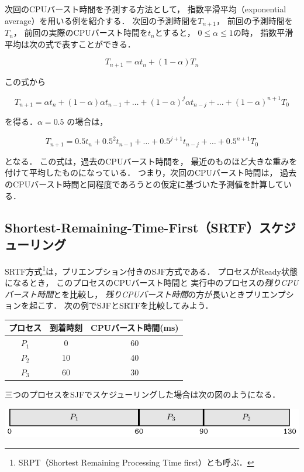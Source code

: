 次回のCPUバースト時間を予測する方法として，
指数平滑平均（exponential average）を用いる例を紹介する．
次回の予測時間を$T_{n+1}$，
前回の予測時間を$T_{n}$，
前回の実際のCPUバースト時間を$t_{n}$とすると，
$0 \le \alpha \le 1$の時，
指数平滑平均は次の式で表すことができる．

\[T_{n+1} = \alpha t_n + ( 1 - \alpha ) T_n\]

この式から

\[T_{n+1} = \alpha t_n + ( 1 - \alpha ) \alpha t_{n-1} + \dots +
( 1 - \alpha )^j \alpha t_{n-j} + \dots + (1 - \alpha )^{n+1} T_0 \]

を得る．$\alpha = 0.5$ の場合は，

\[T_{n+1} = 0.5 t_n + 0.5^2 t_{n-1} + \dots +
0.5^{j+1} t_{n-j} + \dots + 0.5^{n+1} T_0 \]

となる．
この式は，過去のCPUバースト時間を，
最近のものほど大きな重みを付けて平均したものになっている．
つまり，次回のCPUバースト時間は，
過去のCPUバースト時間と同程度であろうとの仮定に基づいた予測値を計算している．

\subsection{Shortest-Remaining-Time-First（SRTF）スケジューリング}
SRTF方式\footnote{
  SRPT（Shortest Remaining Processing Time first）とも呼ぶ．
}は，プリエンプション付きのSJF方式である．
プロセスがReady状態になるとき，
このプロセスのCPUバースト時間と
実行中のプロセスの\emph{残りCPUバースト時間}とを比較し，
\emph{残りCPUバースト時間}の方が長いときプリエンプションを起こす．
次の例でSJFとSRTFを比較してみよう．

\begin{center}
  \begin{tabular}{c c c}
    プロセス & 到着時刻 & CPUバースト時間(ms) \\
    \hline
    $P_1$    & 0  & 60 \\
    $P_2$    & 10 & 40 \\
    $P_3$    & 60 & 30 \\
  \end{tabular}
\end{center}

三つのプロセスをSJFでスケジューリングした場合は次の図のようになる．

\begin{center}
  \includegraphics[scale=1.0]{GanntChart/sjf2.pdf}
\end{center}

